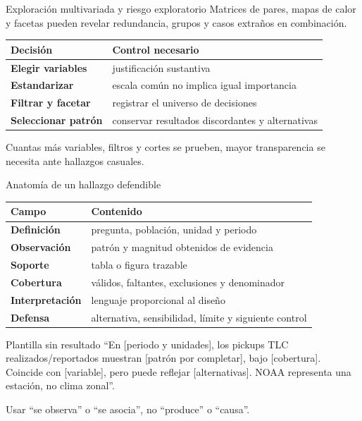 \documentclass[aspectratio=169,11pt]{beamer}
\begin{document}
\begin{frame}{Exploración multivariada y riesgo exploratorio}
  \small
  Matrices de pares, mapas de calor y facetas pueden revelar redundancia, grupos y casos extraños en combinación.
  \vspace{.4em}
  \begin{tabularx}{\textwidth}{>{\bfseries}p{} X}
    \toprule
    Decisión & Control necesario \\
    \midrule
    Elegir variables & justificación sustantiva \\
    Estandarizar & escala común no implica igual importancia \\
    Filtrar y facetar & registrar el universo de decisiones \\
    Seleccionar patrón & conservar resultados discordantes y alternativas \\
    \bottomrule
  \end{tabularx}
  \vspace{.5em}
  \centering
  \par Cuantas más variables, filtros y cortes se prueben, mayor transparencia se necesita ante hallazgos casuales.
\end{frame}

\begin{frame}{Anatomía de un hallazgo defendible}
  \footnotesize
  \begin{tabularx}{\textwidth}{>{\bfseries}p{} X}
    \toprule
    Campo & Contenido \\
    \midrule
    Definición & pregunta, población, unidad y periodo \\
    Observación & patrón y magnitud obtenidos de evidencia \\
    Soporte & tabla o figura trazable \\
    Cobertura & válidos, faltantes, exclusiones y denominador \\
    Interpretación & lenguaje proporcional al diseño \\
    Defensa & alternativa, sensibilidad, límite y siguiente control \\
    \bottomrule
  \end{tabularx}
  \vspace{.5em}
  \begin{block}{Plantilla sin resultado}
    ``En [periodo y unidades], los pickups TLC realizados/reportados muestran [patrón por completar], bajo [cobertura]. Coincide con [variable], pero puede reflejar [alternativas]. NOAA representa una estación, no clima zonal''.
  \end{block}
  \centering Usar ``se observa'' o ``se asocia'', no ``produce'' o ``causa''.
\end{frame}
\end{document}
